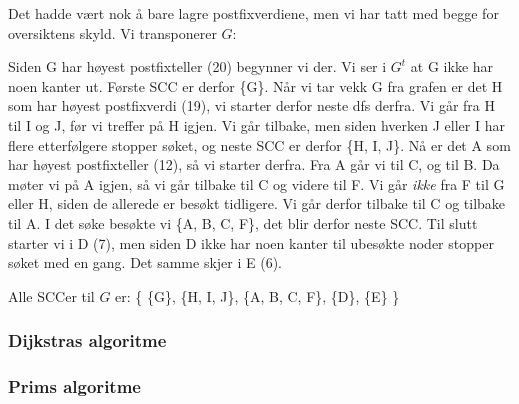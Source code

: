 \begin{eks}
\noindent Det hadde vært nok å bare lagre postfixverdiene, men vi har tatt med begge for oversiktens skyld. Vi transponerer $ G $:

\begin{figure}[H]
\centering
{}
\end{figure}

Siden G har høyest postfixteller (20) begynner vi der. Vi ser i $ G^t $ at G ikke har noen kanter ut. Første SCC er derfor \{G\}. Når vi tar vekk G fra grafen er det H som har høyest postfixverdi (19), vi starter derfor neste dfs derfra. Vi går fra H til I og J, før vi treffer på H igjen. Vi går tilbake, men siden hverken J eller I har flere etterfølgere stopper søket, og neste SCC er derfor \{H, I, J\}. Nå er det A som har høyest postfixteller (12), så vi starter derfra. Fra A går vi til C, og til B. Da møter vi på A igjen, så vi går tilbake til C og videre til F. Vi går \emph{ikke} fra F til G eller H, siden de allerede er besøkt tidligere. Vi går derfor tilbake til C og tilbake til A. I det søke besøkte vi \{A, B, C, F\}, det blir derfor neste SCC. Til slutt starter vi i D (7), men siden D ikke har noen kanter til ubesøkte noder stopper søket med en gang. Det samme skjer i E (6). 

Alle SCCer til $ G $ er: \{ \{G\}, \{H, I, J\}, \{A, B, C, F\}, \{D\}, \{E\} \}
\end{eks}

\subsubsection{\color{red}Dijkstras algoritme}
\label{dijkstra}

\subsubsection{\color{red}Prims algoritme}
\label{prim}

